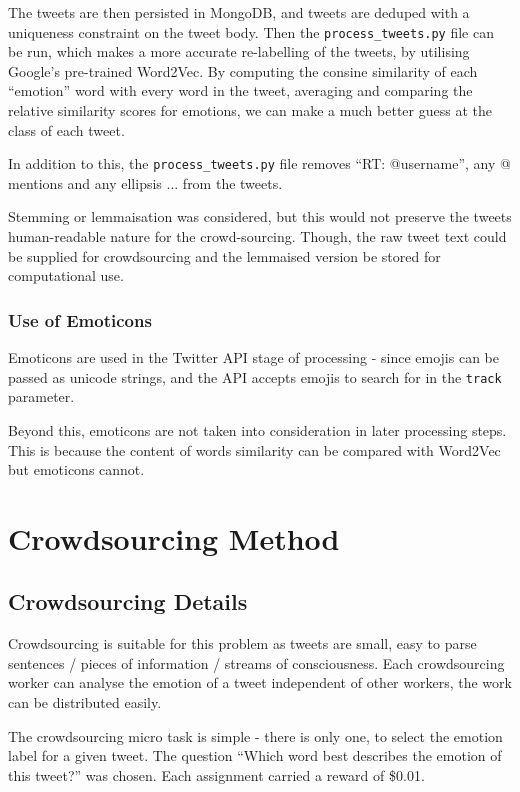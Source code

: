 \documentclass{mproj}
\begin{document}
The tweets are then persisted in MongoDB, and tweets are deduped with a uniqueness constraint on the tweet body. Then the \lstinline{process_tweets.py} file can be run, which makes a more accurate re-labelling of the tweets, by utilising Google's pre-trained Word2Vec. By computing the consine similarity of each ``emotion'' word with every word in the tweet, averaging and comparing the relative similarity scores for emotions, we can make a much better guess at the class of each tweet.

In addition to this, the \lstinline{process_tweets.py} file removes ``RT: @username'', any @ mentions and any ellipsis ... from the tweets.

Stemming or lemmaisation was considered, but this would not preserve the tweets human-readable nature for the crowd-sourcing. Though, the raw tweet text could be supplied for crowdsourcing and the lemmaised version be stored for computational use.

\subsubsection{Use of Emoticons}

Emoticons are used in the Twitter API stage of processing - since emojis can be passed as unicode strings, and the API accepts emojis to search for in the \lstinline{track} parameter.

Beyond this, emoticons are not taken into consideration in later processing steps. This is because the content of words similarity can be compared with Word2Vec but emoticons cannot.


\section{Crowdsourcing Method}
\subsection{Crowdsourcing Details}

Crowdsourcing is suitable for this problem as tweets are small, easy to parse sentences / pieces of information / streams of consciousness. Each crowdsourcing worker can analyse the emotion of a tweet independent of other workers, the work can be distributed easily.

The crowdsourcing micro task is simple - there is only one, to select the emotion label for a given tweet. The question ``Which word best describes the emotion of this tweet?'' was chosen. Each assignment carried a reward of \$0.01.
\end{document}
